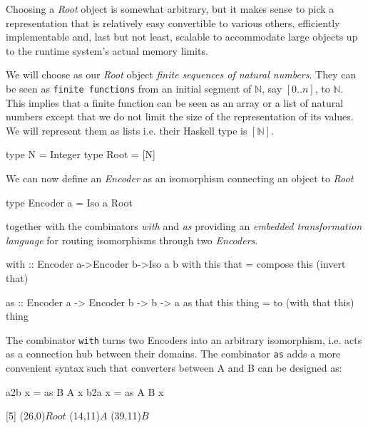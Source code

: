 \documentclass[]{INCLUDES/llncs}
\begin{document}
Choosing a {\em Root} object is somewhat arbitrary, but it makes sense to
pick a representation that is relatively easy convertible to various
others, efficiently implementable and, last but not least, scalable to
accommodate large objects up to the runtime system's 
actual memory limits.

We will choose as our {\em Root} object {\em finite sequences of natural
numbers}. They can be seen as {\tt finite functions} from an initial 
segment of $\mathbb{N}$, say $[0..n]$, to $\mathbb{N}$.
 This implies that a finite
function can be seen as an array or a list of natural 
numbers except that we do not limit the size of 
the representation of its values.
We will represent them as lists i.e. their Haskell type is $[\mathbb{N}]$.
\begin{code}
type N = Integer
type Root = [N]
\end{code}
We can now define an {\em Encoder} as an isomorphism
connecting an object to {\em Root} 
\begin{code}
type Encoder a = Iso a Root
\end{code}
together with the combinators {\em with} and {\em as}
providing an {\em embedded transformation language} for routing
isomorphisms through two {\em Encoders}.
\begin{code}  
with :: Encoder a->Encoder b->Iso a b
with this that = compose this (invert that)

as :: Encoder a -> Encoder b -> b -> a
as that this thing = to (with that this) thing
\end{code}
The combinator {\tt with} turns two Encoders
into an arbitrary isomorphism, i.e. acts as a connection hub between
their domains. The combinator {\tt as} adds a more convenient syntax
such that converters between A and B can be designed as:
\begin{codex}
a2b x = as B A x
b2a x = as A B x
\end{codex}
\vskip 0.30cm
\begindc{\commdiag}[5]
\obj(26,0){$Root$}
\obj(14,11){$A$}
\obj(39,11){$B$}
\end{document}

